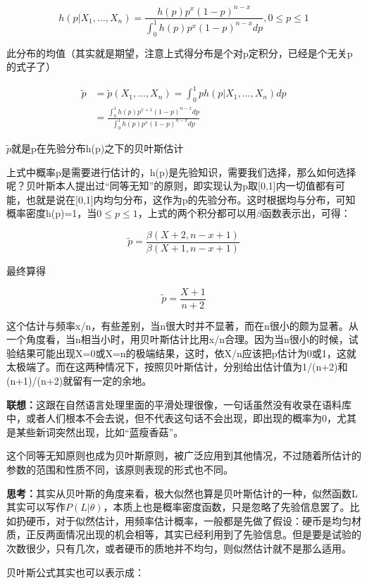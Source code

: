 \documentclass{ctexart}
\begin{document}
	\[h(p|X_1,...,X_n)=\frac{h(p)p^x(1-p)^{n-x}}{\int_{0}^{1}h(p)p^x(1-p)^{n-x}dp}, 0 \leq p \leq 1\]	
	
	此分布的均值（其实就是期望，注意上式得分布是个对p定积分，已经是个无关p的式子了）
	
	\begin{align*}
	\tilde{p}& =\tilde{p}(X_1,...,X_n)=\int_{0}^{1}p h(p|X_1,...,X_n)dp \\
	             & = \frac{\int_{0}^{1}h(p)p^{x+1}(1-p)^{n-x}dp}{\int_{0}^{1}h(p)p^x(1-p)^{n-x}dp}
	\end{align*}
	
	\(\tilde{p}\)就是p在先验分布h(p)之下的贝叶斯估计
	
	上式中概率p是需要进行估计的，h(p)是先验知识，需要我们选择，那么如何选择呢？贝叶斯本人提出过“同等无知”的原则，即实现认为p取[0,1]内一切值都有可能，也就是说在[0,1]内均匀分布，这作为p的先验分布。这时根据均与分布，可知概率密度h(p)=1，当\(0 \leq p \leq 1\)，上式的两个积分都可以用\(\beta\)函数表示出，可得：
	
	\[\tilde{p}=\frac{\beta(X+2,n-x+1)}{\beta(X+1,n-x+1)}\]
	
	最终算得
	
	\[\tilde{p}=\frac{X+1}{n+2}\]
	
	这个估计与频率x/n，有些差别，当n很大时并不显著，而在n很小的颇为显著。从一个角度看，当n相当小时，用贝叶斯估计比用x/n合理。因为当n很小的时候，试验结果可能出现X=0或X=n的极端结果，这时，依X/n应该把p估计为0或1，这就太极端了。而在这两种情况下，按照贝叶斯估计，分别给出估计值为1/(n+2)和(n+1)/(n+2)就留有一定的余地。
	
	\textbf{联想：}这跟在自然语言处理里面的平滑处理很像，一句话虽然没有收录在语料库中，或者人们根本不会去说，但不代表这句话不会出现，即出现的概率为0，尤其是某些新词突然出现，比如“蓝瘦香菇”。
	
	\mbox{}
	
	这个同等无知原则也成为贝叶斯原则，被广泛应用到其他情况，不过随着所估计的参数的范围和性质不同，该原则表现的形式也不同。
	
	\mbox{}
	
	\textbf{思考：}其实从贝叶斯的角度来看，极大似然也算是贝叶斯估计的一种，似然函数L其实可以写作\(P(L|\theta)\)，本质上也是概率密度函数，只是忽略了先验信息罢了。比如扔硬币，对于似然估计，用频率估计概率，一般都是先做了假设：硬币是均匀材质，正反两面情况出现的机会相等，其实已经利用到了先验信息。但是要是试验的次数很少，只有几次，或者硬币的质地并不均匀，则似然估计就不是那么适用。
	
	贝叶斯公式其实也可以表示成：
	
\end{document}
